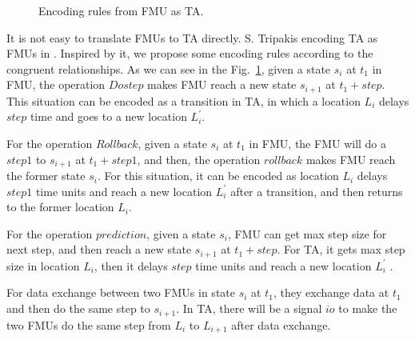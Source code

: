 \begin{figure}[htbp]
	\caption{Encoding rules from FMU as TA.}
	\label{fmutota}
\end{figure}

It is not easy to translate FMUs to TA directly. S. Tripakis encoding TA as FMUs in \cite{Tripakis15}. Inspired by it, we propose some encoding rules according to the congruent relationships. As we can see in the Fig.~\ref{fmutota}, given a state $s_{i}$ at $t_{1}$ in FMU, the operation $Dostep$ makes FMU reach a new state $s_{i+1}$ at $t_{1}+step$. This situation can be encoded as a transition in TA, in which a location $L_{i}$ delays $step$ time and goes to a new location $L_{i}^{\prime}$.

For the operation $Rollback$, given a state $s_{i}$ at $t_{1}$ in FMU, the FMU will do a $step1$ to $s_{i+1}$ at $t_{1}+step1$, and then, the operation $rollback$ makes FMU reach the former state $s_{i}$. For this situation, it can be encoded as location $L_{i}$ delays $step1$ time units and reach a new location $L_{i}^{\prime}$ after a transition, and then returns to the former location $L_{i}$. 

For the operation $prediction$, given a state $s_{i}$, FMU can get max step size for next step, and then reach a new state $s_{i+1}$ at $t_{1}+step$. For TA, it gets max step size in location $L_{i}$, then it delays $step$ time units and reach a new location $L_{i}^{\prime}$ .

For data exchange between two FMUs in state $s_{i}$ at $t_{1}$, they exchange data at $t_{1}$ and then do the same step to $s_{i+1}$. In TA, there will be a signal $io$ to make the two FMUs do the same step from $L_{i}$ to $L_{i+1}$ after data exchange.


